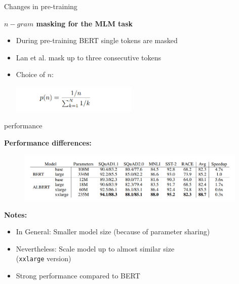 
\begin{frame}{Changes in pre-training}

\vfill

	\textbf{$n-gram$ masking for the MLM task}
		
	\begin{itemize}
			\item During pre-training BERT single tokens are masked
			\item Lan et al. mask up to three consecutive tokens
			\item Choice of $n$:\\
						\begin{center}
							\includegraphics[width = 6cm]{figure/albert-choice-n.png}
						\end{center}
	\end{itemize}

\vfill

\end{frame}


\begin{frame}{performance}

	\textbf{Performance differences:}

	\begin{figure}
		\centering
		\includegraphics[width = 11cm]{figure/albert-sota.png}\\ 
	\end{figure}

	\textbf{Notes:}

	\begin{itemize}
		\item In General: Smaller model size (because of parameter sharing)
		\item Nevertheless: Scale model up to almost similar size\\(\texttt{xxlarge} version)
		\item Strong performance compared to BERT
	\end{itemize}
\end{frame}


\endlecture

